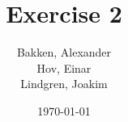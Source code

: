 \newcommand{\mytitle}{Exercise 2}
\newcommand{\mygroupnumber}{5}
\newcommand{\myauthor}{Bakken, Alexander\\Hov, Einar\\Lindgren, Joakim}

\title{\mytitle}
\author{\myauthor}
\date{\today}
